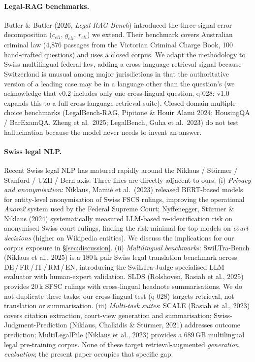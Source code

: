 \documentclass[11pt,a4paper]{article}
\begin{document}
\paragraph{Legal-RAG benchmarks.}
Butler \& Butler (2026, \emph{Legal RAG Bench}) introduced the
three-signal error decomposition ($c_{eli}$, $g_{eli}$,
$r_{eli}$) we extend.  Their
benchmark covers Australian criminal law (4{,}876 passages from the
Victorian Criminal Charge Book, 100 hand-crafted questions) and uses
a closed corpus.  We adapt the methodology to Swiss multilingual
federal law, adding a cross-language retrieval signal because
Switzerland is unusual among major jurisdictions in that the
authoritative version of a leading case may be in a language
other than the question's (we acknowledge that v0.2 includes
only one cross-lingual question, q-028; v1.0 expands this to a
full cross-language retrieval suite).  Closed-domain multiple-choice benchmarks
(LegalBench-RAG, Pipitone \& Houir Alami 2024; HousingQA /
BarExamQA, Zheng et al.\ 2025; LegalBench, Guha et al.\ 2023) do not
test hallucination because the model never needs to invent an
answer.

\paragraph{Swiss legal NLP.}
Recent Swiss legal NLP has matured rapidly around the Niklaus /
St{\"u}rmer / Stanford / UZH / Bern axis.  Three lines are
directly adjacent to ours.  (i) \emph{Privacy and anonymisation}:
Niklaus, Mami{\'e} et al.\ (2023) released BERT-based models for
entity-level anonymisation of Swiss FSCS rulings, improving the
operational \emph{Anom2} system used by the Federal Supreme Court;
Nyffenegger, St{\"u}rmer \& Niklaus (2024) systematically measured
LLM-based re-identification risk on anonymised Swiss court rulings,
finding the risk minimal for top models on \emph{court decisions}
(higher on Wikipedia entities).  We discuss the implications for
our corpus exposure in \S\ref{sec:discussion}.  (ii) \emph{Multilingual
benchmarks}: SwiLTra-Bench (Niklaus et al., 2025) is a 180\,k-pair
Swiss legal translation benchmark across DE\,/\,FR\,/\,IT\,/\,RM\,/\,EN,
introducing the SwiLTra-Judge specialised LLM evaluator with
human-expert validation.  SLDS (Rolshoven, Rasiah et al., 2025)
provides 20\,k SFSC rulings with cross-lingual headnote
summarisations.  We do not duplicate these tasks; our cross-lingual
test (q-028) targets retrieval, not translation or summarisation.
(iii) \emph{Multi-task suites}: SCALE (Rasiah et al., 2023) covers
citation extraction, court-view generation and summarisation;
Swiss-Judgment-Prediction (Niklaus, Chalkidis \& St{\"u}rmer, 2021)
addresses outcome prediction; MultiLegalPile (Niklaus et al., 2023)
provides a 689\,GB multilingual legal pre-training corpus.  None of
these target retrieval-augmented \emph{generation evaluation}; the
present paper occupies that specific gap.
\end{document}
